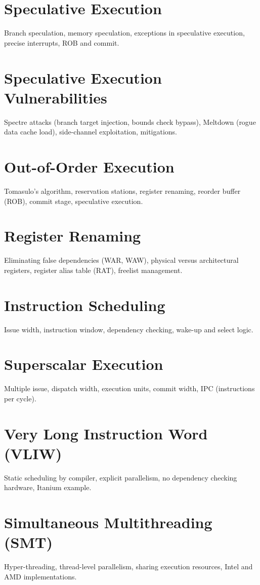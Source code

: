\chapter{Speculative Execution}
Branch speculation, memory speculation, exceptions in speculative execution, precise interrupts, ROB and commit.

\chapter{Speculative Execution Vulnerabilities}
Spectre attacks (branch target injection, bounds check bypass), Meltdown (rogue data cache load), side-channel exploitation, mitigations.

\chapter{Out-of-Order Execution}
Tomasulo's algorithm, reservation stations, register renaming, reorder buffer (ROB), commit stage, speculative execution.

\chapter{Register Renaming}
Eliminating false dependencies (WAR, WAW), physical versus architectural registers, register alias table (RAT), freelist management.

\chapter{Instruction Scheduling}
Issue width, instruction window, dependency checking, wake-up and select logic.

\chapter{Superscalar Execution}
Multiple issue, dispatch width, execution units, commit width, IPC (instructions per cycle).

\chapter{Very Long Instruction Word (VLIW)}
Static scheduling by compiler, explicit parallelism, no dependency checking hardware, Itanium example.

\chapter{Simultaneous Multithreading (SMT)}
Hyper-threading, thread-level parallelism, sharing execution resources, Intel and AMD implementations.

